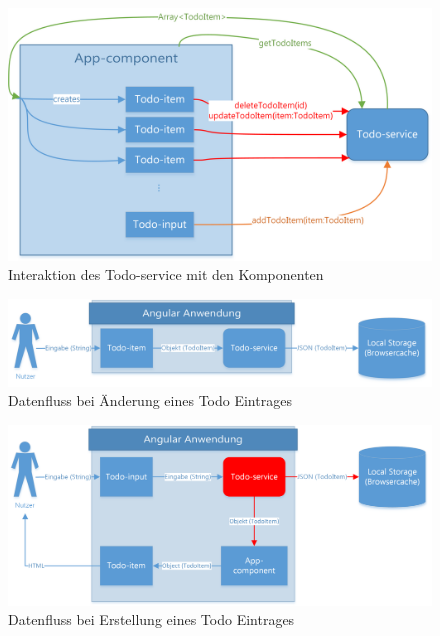 \begin{figure}[h]
	\includegraphics[width=\textwidth]{img/pwa_components.png}
	\centering
	\caption{Interaktion des Todo-service mit den Komponenten}
	\label{fig:pwa_todo_service}
\end{figure}

\begin{figure}[h]
	\includegraphics[width=\textwidth]{img/pwa_datenfluss_eingabe.png}
	\centering
	\caption{Datenfluss bei Änderung eines Todo Eintrages}
	\label{fig:pwa_datenfluss_eingabe}
\end{figure}

\begin{figure}[h]
	\includegraphics[width=\textwidth]{img/pwa_datenfluss_erstellen.png}
	\centering
	\caption{Datenfluss bei Erstellung eines Todo Eintrages}
	\label{fig:pwa_datenfluss_erstellen}
\end{figure}


